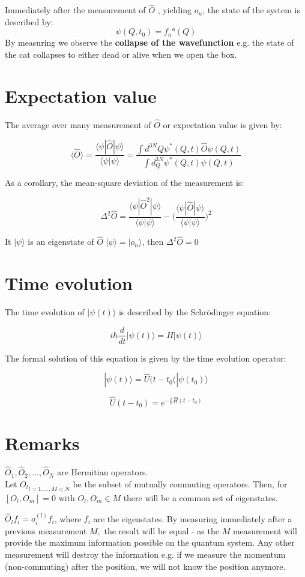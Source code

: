 Immediately after the measurement of $\hat{O}$ , yielding $o_n$, the state of the system is described by:
$$\psi(Q,t_0)=f_n°(Q)$$
By measuring we observe the \textbf{collapse of the wavefunction} e.g. the state of the cat collapses to either dead or alive when we open the box.
\section{Expectation value}
The average over many measurement of $\hat{O}$ or expectation value is given by:

$$\langle \hat{O}\rangle = \frac{\langle\psi|\hat{O}|\psi\rangle}{\langle \psi|\psi\rangle}=\frac{\int d^{3 N} Q \psi^{*}(Q, t) \hat{O} \psi(Q, t)}{\int d_{Q}^{3 N} \psi^{*}(Q, t) \psi(Q, t)}$$

As a corollary,  the mean-square deviation of the measurement is:

$$\Delta^2\hat{O} = \frac{\langle \psi|\hat{O}^2|\psi\rangle}{\langle\psi|\psi\rangle}-\biggl(\frac{\langle\psi|\hat{O}|\psi\rangle}{\langle\psi|\psi\rangle}\biggr)^2$$

It $|\psi\rangle$ is an eigenstate of $\hat{O}$ $|\psi\rangle = |o_n\rangle$, then $\Delta^2\hat{O} = 0$

\section{Time evolution}
The time evolution of $|\psi(t)\rangle$ is described by the Schr\"odinger equation:

$$i\hbar \frac{d{}}{d{t}}|\psi(t)\rangle = H|\psi(t)\rangle$$

The formal solution of this equation is given by the time evolution operator:

$$|\psi(t)\rangle = \hat{U}(t-t_0(|\psi(t_0)\rangle$$

$$\hat{U}(t-t_0) = e^{-\frac{i}{\hbar}\hat{H}(t-t_0)}$$

\section{Remarks}
$\hat{O}_1,\hat{O}_2,...,\hat{O}_N$ are Hermitian operators.\\
Let ${O_l}_{l=1,...,M<N}$ be the subset of mutually commuting operators. Then, for $[O_l,O_m]=0$ with $O_l,O_m \in M$ there will be a common set of eigenstates.\\
\noindent

$\hat{O}_lf_i=o_i^{(l)}f_i$, where $f_i$ are the eigenstates. By measuring immediately after a previous measurement $M,$ the result will be equal - as the $M$ measurement will provide the maximum information possible on the quantum system. Any other measurement will destroy the information e.g. if we measure the momentum (non-commuting) after the position, we will not know the position anymore.

